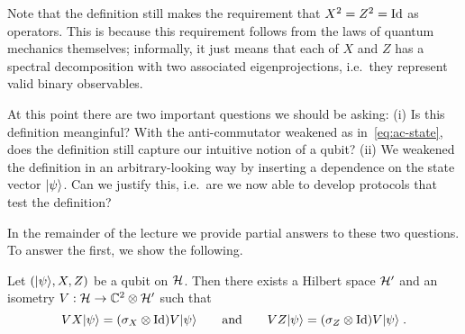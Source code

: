 Note that the definition still makes the requirement that  $X^2=Z^2=\mathop{\rm Id}\nolimits$ as operators. This is because this requirement follows from the laws of quantum mechanics themselves; informally, it just means that each of $X$ and $Z$ has a spectral decomposition with two associated eigenprojections, i.e.\ they represent valid binary observables. 

At this point there are two important questions we should be asking: (i) Is this definition meanginful? With the anti-commutator weakened as in~\eqref{eq:ac-state}, does the definition still capture our intuitive notion of a qubit? (ii) We weakened the definition in an arbitrary-looking way by inserting a dependence on the state vector $|\psi\rangle$. Can we justify this, i.e.\ are we now able to develop protocols that test the definition? 

In the remainder of the lecture we provide partial answers to these two questions. To answer the first, we show the following. 

\begin{lemma}\label{lem:qubit-2-rigid}
Let $(|\psi\rangle,X,Z)$  be a qubit on $\mathcal{H}$. Then there exists a Hilbert space $\mathcal{H}'$ and an isometry $V: \mathcal{H}\to  \mathbb{C}^2 \otimes \mathcal{H}'$  such that 
\begin{equation}\label{eq:qubit-2-rigid-a}
 V X |\psi\rangle =  (\sigma_X \otimes \mathop{\rm Id}\nolimits )V |\psi\rangle\qquad \text{and}\qquad  V Z |\psi\rangle =  (\sigma_Z \otimes \mathop{\rm Id}\nolimits )V |\psi\rangle \;.
\end{equation}
\end{lemma}

